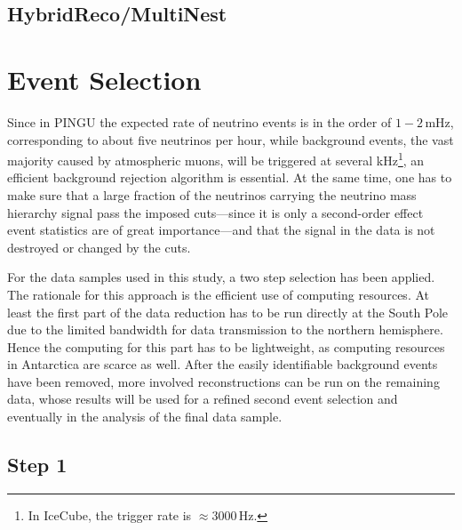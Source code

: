 \subsection{HybridReco/MultiNest}
\label{sec:reco_multinest}


\section{Event Selection}
\label{sec:EvtSel}

Since in PINGU the expected rate of neutrino events is in the order of $1 -
2$\,mHz, corresponding to about five neutrinos per hour, while background
events, the vast majority caused by atmospheric muons, will be triggered at
several kHz\footnote{In IceCube, the trigger rate is $\approx 3000$\,Hz.}, an
efficient background rejection algorithm is essential. At the same time, one
has to make sure that a large fraction of the neutrinos carrying the neutrino
mass hierarchy signal pass the imposed cuts---since it is only a second-order
effect event statistics are of great importance---and that the signal in the
data is not destroyed or changed by the cuts.

For the data samples used in this study, a two step selection has been applied.
The rationale for this approach is the efficient use of computing resources.
At least the first part of the data reduction has to be run directly at the
South Pole due to the limited bandwidth for data transmission to the northern
hemisphere. Hence the computing for this part has to be lightweight, as
computing resources in Antarctica are scarce as well. After the easily
identifiable background events have been removed, more involved
reconstructions can be run on the remaining data, whose results will be used for
a refined second event selection and eventually in the analysis of the final
data sample.


\subsection{Step 1}
\label{sec:cuts_step1}

